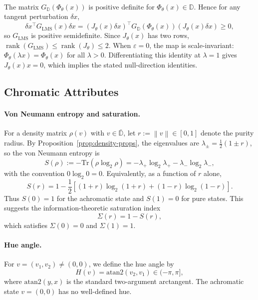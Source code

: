 \documentclass[11pt]{article}
\makeatletter
\theoremstyle{plain}
\theoremstyle{definition}
\theoremstyle{remark}
\renewenvironment{proof}[1][\proofname]{\par\pushQED{\qed}\normalfont
\topsep6\p@\@plus6\p@\relax
\trivlist\item[\hskip\labelsep\bfseries #1\@addpunct{.}]\mbox{}\\\ignorespaces}{\popQED\endtrivlist\@endpefalse}
\newcommand{\D}{\mathbb{D}}
\newcommand{\norm}[1]{\left\lVert #1 \right\rVert}
\newcommand{\Tr}{\mathrm{Tr}}
\makeatother
\begin{document}
\begin{proof}
The matrix $G_\D(\Phi_\theta(x))$ is positive definite for $\Phi_\theta(x) \in \D$. Hence for any tangent perturbation $\delta x$,
\[
\delta x^\top G_{\mathrm{LMS}}(x)\delta x
= (J_\theta(x)\delta x)^\top G_\D(\Phi_\theta(x))(J_\theta(x)\delta x) \geq 0,
\]
so $G_{\mathrm{LMS}}$ is positive semidefinite. Since $J_\theta(x)$ has two rows, $\operatorname{rank}(G_{\mathrm{LMS}}) \leq \operatorname{rank}(J_\theta) \leq 2$. When $\varepsilon=0$, the map is scale-invariant: $\Phi_\theta(\lambda x)=\Phi_\theta(x)$ for all $\lambda>0$. Differentiating this identity at $\lambda=1$ gives $J_\theta(x)x=0$, which implies the stated null-direction identities.
\end{proof}

\subsection{Chromatic Attributes}
\label{sec:attributes}

\paragraph{Von Neumann entropy and saturation.}

For a density matrix $\rho(v)$ with $v \in \bar{\D}$, let $r := \norm{v} \in [0, 1]$ denote the purity radius. By Proposition~\ref{prop:density-props}, the eigenvalues are $\lambda_\pm = \frac{1}{2}(1 \pm r)$, so the von Neumann entropy is
\begin{equation}
S(\rho) := -\Tr(\rho \log_2 \rho) = -\lambda_+ \log_2 \lambda_+ - \lambda_- \log_2 \lambda_-,
\end{equation}
with the convention $0 \log_2 0 = 0$. Equivalently, as a function of $r$ alone,
\begin{equation}
S(r) = 1 - \frac{1}{2}\left[ (1+r)\log_2(1+r) + (1-r)\log_2(1-r) \right].
\end{equation}
Thus $S(0) = 1$ for the achromatic state and $S(1) = 0$ for pure states. This suggests the information-theoretic saturation index
\begin{equation}
\Sigma(r) = 1 - S(r),
\end{equation}
which satisfies $\Sigma(0) = 0$ and $\Sigma(1) = 1$.

\paragraph{Hue angle.} For $v = (v_1, v_2) \neq (0,0)$, we define the hue angle by
\begin{equation}
H(v) = \mathrm{atan2}(v_2, v_1) \in (-\pi, \pi],
\end{equation}
where $\mathrm{atan2}(y, x)$ is the standard two-argument arctangent. The achromatic state $v = (0,0)$ has no well-defined hue.
\end{document}
